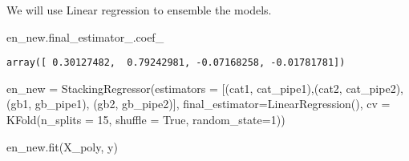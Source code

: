 \documentclass[
  letterpaper,
  DIV=11,
  numbers=noendperiod]{scrreprt}
\newenvironment{Shaded}{\begin{snugshade}}{\end{snugshade}}
\newcommand{\DecValTok}[1]{\textcolor[rgb]{0.68,0.00,0.00}{#1}}
\newcommand{\NormalTok}[1]{\textcolor[rgb]{0.00,0.23,0.31}{#1}}
\newcommand{\OperatorTok}[1]{\textcolor[rgb]{0.37,0.37,0.37}{#1}}
\newcommand{\StringTok}[1]{\textcolor[rgb]{0.13,0.47,0.30}{#1}}
\newcommand{\VariableTok}[1]{\textcolor[rgb]{0.07,0.07,0.07}{#1}}
\begin{document}
We will use Linear regression to ensemble the models.

\begin{Shaded}
\begin{Highlighting}[]
\NormalTok{en\_new.final\_estimator\_.coef\_}
\end{Highlighting}
\end{Shaded}

\begin{verbatim}
array([ 0.30127482,  0.79242981, -0.07168258, -0.01781781])
\end{verbatim}

\begin{Shaded}
\begin{Highlighting}[]
\NormalTok{en\_new }\OperatorTok{=}\NormalTok{ StackingRegressor(estimators }\OperatorTok{=}\NormalTok{ [(}\StringTok{\textquotesingle{}cat1\textquotesingle{}}\NormalTok{, cat\_pipe1),(}\StringTok{\textquotesingle{}cat2\textquotesingle{}}\NormalTok{, cat\_pipe2),}
\NormalTok{                                        (}\StringTok{\textquotesingle{}gb1\textquotesingle{}}\NormalTok{, gb\_pipe1), (}\StringTok{\textquotesingle{}gb2\textquotesingle{}}\NormalTok{, gb\_pipe2)],}
\NormalTok{                     final\_estimator}\OperatorTok{=}\NormalTok{LinearRegression(),                                          }
\NormalTok{                    cv }\OperatorTok{=}\NormalTok{ KFold(n\_splits }\OperatorTok{=} \DecValTok{15}\NormalTok{, shuffle }\OperatorTok{=} \VariableTok{True}\NormalTok{, random\_state}\OperatorTok{=}\DecValTok{1}\NormalTok{))}
\end{Highlighting}
\end{Shaded}

\begin{Shaded}
\begin{Highlighting}[]
\NormalTok{en\_new.fit(X\_poly, y)}
\end{Highlighting}
\end{Shaded}
\end{document}
